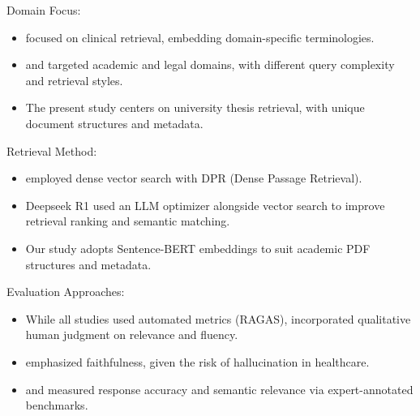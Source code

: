 \begin{refsection}
Domain Focus:
\begin{itemize}
    \item \citeauthor{arzideh2024miracle} \citeyear{arzideh2024miracle} focused on clinical retrieval, embedding domain-specific terminologies.
    \item \citeauthor{grigoryan2024building} \citeyear{grigoryan2024building} and \citeauthor{ryu2023retrieval} \citeyear{ryu2023retrieval} targeted academic and legal domains, with different query complexity and retrieval styles.
    \item The present study centers on university thesis retrieval, with unique document structures and metadata.
\end{itemize}

Retrieval Method:
\begin{itemize}
    \item \citeauthor{lewis2020retrieval} \citeyear{lewis2020retrieval} employed dense vector search with DPR (Dense Passage Retrieval).
    \item Deepseek R1 used an LLM optimizer alongside vector search to improve retrieval ranking and semantic matching.
    \item Our study adopts Sentence-BERT embeddings to suit academic PDF structures and metadata.
\end{itemize}

Evaluation Approaches:
\begin{itemize}
    \item While all studies used automated metrics (RAGAS), \citeauthor{aquino2024extracting} \citeyear{aquino2024extracting} incorporated qualitative human judgment on relevance and fluency.
    \item \citeauthor{arzideh2024miracle}  \citeyear{arzideh2024miracle} emphasized faithfulness, given the risk of hallucination in healthcare.
    \item \citeauthor{grigoryan2024building} \citeyear{grigoryan2024building} and \citeauthor{ryu2023retrieval} \citeyear{ryu2023retrieval} measured response accuracy and semantic relevance via expert-annotated benchmarks.
\end{itemize}


\end{refsection}

